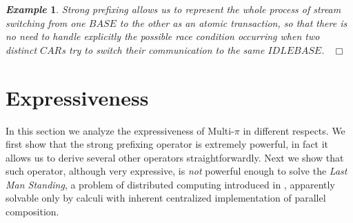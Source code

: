 \documentclass[submission,copyright,creativecommons]{eptcs}
\newcommand{\fine}{{\mbox{ }\nolinebreak\hfill{$\Box$}}}
\newcommand{\rec}[2]{\mbox{rec}\, #1.#2}
\newtheorem{aexample}{\it Example}
\newenvironment{example}{\begin{aexample} }{\end{aexample}}
\begin{document}
\begin{example}
Strong prefixing allows us to represent the whole process of stream switching from one $BASE$ to the other as an atomic transaction, so that there is %
no need to handle explicitly the possible race condition occurring when two distinct $CAR$s try to switch their communication to the 
same $IDLEBASE$.
\fine





\end{example}



\section{Expressiveness\\[-.6cm]}\label{multi-expr}
In this section we analyze the expressiveness of Multi-$\pi$ in different respects. We first show that the 
strong prefixing operator is extremely powerful, in fact it allows us to derive several other operators straightforwardly.
Next we show that such operator, although very expressive, is {\em not} powerful enough to solve the {\em Last Man Standing},
a problem of distributed computing introduced in \cite{VBG09}, apparently solvable only by calculi with inherent centralized
implementation of parallel composition.
\end{document}
